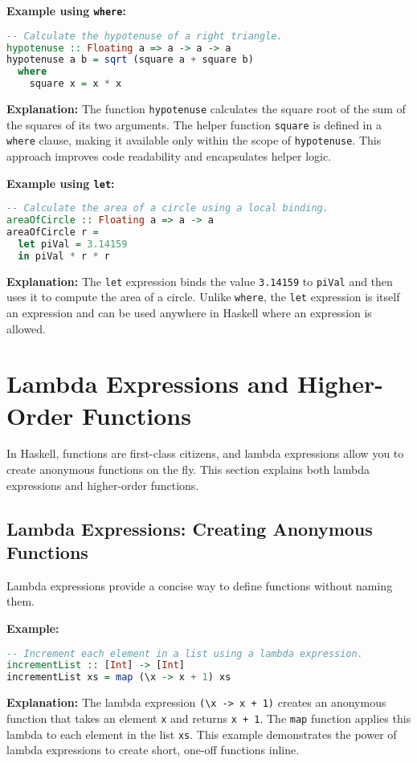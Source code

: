 \documentclass[11pt,a4paper]{article}
\begin{document}
\textbf{Example using \texttt{where}:}
\begin{lstlisting}[language=Haskell]
-- Calculate the hypotenuse of a right triangle.
hypotenuse :: Floating a => a -> a -> a
hypotenuse a b = sqrt (square a + square b)
  where
    square x = x * x
\end{lstlisting}

\textbf{Explanation:}  
The function \texttt{hypotenuse} calculates the square root of the sum of the squares of its two arguments. The helper function \texttt{square} is defined in a \texttt{where} clause, making it available only within the scope of \texttt{hypotenuse}. This approach improves code readability and encapsulates helper logic.

\textbf{Example using \texttt{let}:}
\begin{lstlisting}[language=Haskell]
-- Calculate the area of a circle using a local binding.
areaOfCircle :: Floating a => a -> a
areaOfCircle r =
  let piVal = 3.14159
  in piVal * r * r
\end{lstlisting}

\textbf{Explanation:}  
The \texttt{let} expression binds the value \texttt{3.14159} to \texttt{piVal} and then uses it to compute the area of a circle. Unlike \texttt{where}, the \texttt{let} expression is itself an expression and can be used anywhere in Haskell where an expression is allowed.

\section{Lambda Expressions and Higher-Order Functions}
In Haskell, functions are first-class citizens, and lambda expressions allow you to create anonymous functions on the fly. This section explains both lambda expressions and higher-order functions.

\subsection{Lambda Expressions: Creating Anonymous Functions}
Lambda expressions provide a concise way to define functions without naming them.

\textbf{Example:}
\begin{lstlisting}[language=Haskell]
-- Increment each element in a list using a lambda expression.
incrementList :: [Int] -> [Int]
incrementList xs = map (\x -> x + 1) xs
\end{lstlisting}

\textbf{Explanation:}  
The lambda expression \texttt{(\textbackslash x -> x + 1)} creates an anonymous function that takes an element \texttt{x} and returns \texttt{x + 1}. The \texttt{map} function applies this lambda to each element in the list \texttt{xs}. This example demonstrates the power of lambda expressions to create short, one-off functions inline.
\end{document}
